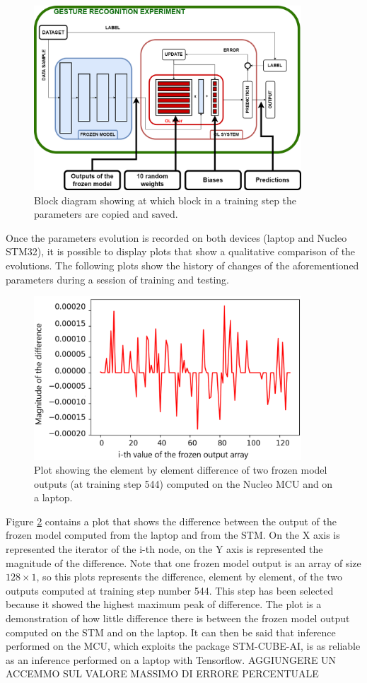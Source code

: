 \documentclass[12pt]{report}
\begin{document}
\begin{figure}[h!]
    \centering
    \includegraphics[width=100mm]{Figures/Chapter5/evolution.png} 
    \caption{Block diagram showing at which block in a training step the parameters are copied and saved.}
    \label{fig:evolution_params}    
\end{figure}

Once the parameters evolution is recorded on both devices (laptop and Nucleo STM32), it is possible to display plots that show a qualitative comparison of the evolutions. The following plots show the history of changes of the aforementioned parameters during a session of training and testing.

\begin{figure}[h!]
    \centering
    \includegraphics[width=100mm]{Figures/Chapter5/frozen_example.png} 
    \caption{Plot showing the element by element difference of two frozen model outputs (at training step 544) computed on the Nucleo MCU and on a laptop.}
    \label{fig:comparison_frozen}    
\end{figure}

Figure \ref{fig:comparison_frozen} contains a plot that shows the difference between the output of the frozen model computed from the laptop and from the STM. On the X axis is represented the iterator of the i-th node, on the Y axis is represented the magnitude of the difference. Note that one frozen model output is an array of size $128 \times 1$, so this plots represents the difference, element by element, of the two outputs computed at training step number 544. This step has been selected because it showed the highest maximum peak of difference. The plot is a demonstration of how little difference there is between the frozen model output computed on the STM and on the laptop. It can then be said that inference performed on the MCU, which exploits the package STM-CUBE-AI, is as reliable as an inference performed on a laptop with Tensorflow.
AGGIUNGERE UN ACCEMMO SUL VALORE MASSIMO DI ERRORE PERCENTUALE
\end{document}
